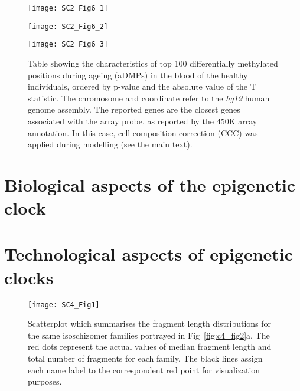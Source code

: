 \begin{figure}[htbp!]
	\centering    
	\texttt{[image: SC2\_Fig6\_1]}
\end{figure}
\begin{figure}[htbp!]
	\centering    
	\texttt{[image: SC2\_Fig6\_2]}
\end{figure}
\begin{figure}[htbp!]
	\centering    
	\texttt{[image: SC2\_Fig6\_3]}
	\caption[Table showing the top 100 aDMPs]{Table showing the characteristics of top 100 differentially methylated positions during ageing (aDMPs) in the blood of the healthy individuals, ordered by p-value and the absolute value of the T statistic. The chromosome and coordinate refer to the \textit{hg19} human genome assembly. The reported genes are the closest genes associated with the array probe, as reported by the 450K array annotation. In this case, cell composition correction (CCC) was applied during modelling (see the main text).}
	\vspace*{6.5in}
	\label{fig:sc2_fig6}
\end{figure}	






\clearpage

\renewcommand{\thesection}{S.2}   
\section{Biological aspects of the epigenetic clock}

\renewcommand\thefigure{S2.\arabic{figure}}    
\bigskip

\smallskip

\clearpage

\renewcommand{\thesection}{S.3}   
\section{Technological aspects of epigenetic clocks}

\renewcommand\thefigure{S3.\arabic{figure}}    
\bigskip

\begin{figure}[htbp!] 
	\centering    
	\setcounter{figure}{0}
	\texttt{[image: SC4\_Fig1]}
	\caption[Scatterplot of fragment length distributions for the isoschizomer families]{Scatterplot which summarises the fragment length distributions for the same isoschizomer families portrayed in Fig~\ref{fig:c4_fig2}a. The red dots represent the actual values of median fragment length and total number of fragments for each family. The black lines assign each name label to the correspondent red point for visualization purposes.}
	\label{fig:sc4_fig1}
\end{figure}

